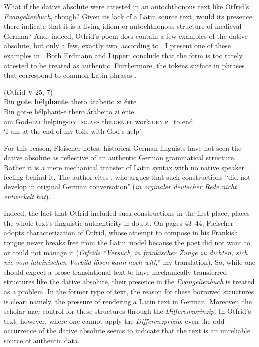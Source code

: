 What if the dative absolute were attested in an autochthonous text like Otfrid’s \textit{Evangelienbuch}, though? Given its lack of a Latin source text, would its presence there indicate that it is a living idiom or autochthonous structure of medieval German? And, indeed, Otfrid’s poem does contain a few examples of the dative absolute, but only a few, exactly two, according to \citet[V 25, 7 and IV 13, 52--53, page 259]{Erdmann1874}. I present one of these examples in . Both Erdmann and Lippert conclude that the form is too rarely attested to be treated as authentic. Furthermore, the tokens surface in phrases that correspond to common Latin phrases \citep[43]{Fleischer2006}.

\ea%
    \label{ex:2:6}(Otfrid V 25, 7)\\
    Bin \textbf{gote hélphante}  thero árabeito zi énte\\
    \gll Bin  got-e       hélphant-e      thero    árabeito        zi    énte\\
    am   God-\textsc{dat}  helping-\textsc{dat.sg.abs}   the.\textsc{gen.pl}  work.\textsc{gen.pl}     to     end\\
    \glt ‘I am at the end of my toils with God’s help’
\z

\noindent For this reason, Fleischer notes, historical German linguists have not seen the dative absolute as reflective of an authentic German grammatical structure. Rather it is a mere mechanical transfer of Latin syntax with no native speaker feeling behind it. The author cites \citet[259]{Erdmann1874}, who argues that such constructions “did not develop in original German conversation” (\textit{in orginaler deutscher Rede nicht entwickelt hat}).

\begin{sloppypar}
Indeed, the fact that Otfrid included such constructions in the first place, places the whole text’s linguistic authenticity in doubt. On pages 43--44, Fleischer adopts  characterization of Otfrid, whose attempt to compose in his Frankish tongue never breaks free from the Latin model because the poet did not want to or could not manage it (\textit{Otfrids “Versuch, in fränkischer Zunge zu dichten, sich nie vom lateinischen Vorbild lösen kann noch will},” my translation). So, while one should expect a prose translational text to have mechanically transferred structures like the dative absolute, their presence in the \textit{Evangelienbuch} is treated as a problem. In the former type of text, the reason for these borrowed structures is clear: namely, the pressure of rendering a Latin text in German. Moreover, the scholar may control for these structures through the \textit{Differenzprinzip}. In Otfrid’s text, however, where one cannot apply the \textit{Differenzprizip}, even the odd occurrence of the dative absolute seems to indicate that the text is an unreliable source of authentic data.
\end{sloppypar}

